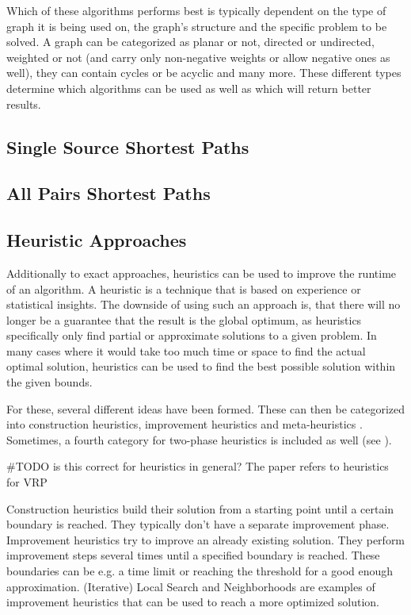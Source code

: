 Which of these algorithms performs best is typically dependent on the type of graph it is being used on, the graph's structure and the specific problem to be solved. 
A graph can be categorized as planar or not, directed or undirected, weighted or not (and carry only non-negative weights or allow negative ones as well), they can contain cycles or be acyclic and many more. 
These different types determine which algorithms can be used as well as which will return better results.

\subsection{Single Source Shortest Paths}


\subsection{All Pairs Shortest Paths}


\subsection{Heuristic Approaches}

Additionally to exact approaches, heuristics can be used to improve the runtime of an algorithm.
A heuristic is a technique that is based on experience or statistical insights.
The downside of using such an approach is, that there will no longer be a guarantee that the result is the global optimum, as heuristics specifically only find partial or approximate solutions to a given problem. 
In many cases where it would take too much time or space to find the actual optimal solution, heuristics can be used to find the best possible solution within the given bounds.

For these, several different ideas have been formed. 
These can then be categorized into construction heuristics, improvement heuristics and meta-heuristics \cite{ropke_heuristic_2005}.
Sometimes, a fourth category for two-phase heuristics is included as well (see \cite{laporteClassicalHeuristicsCapacitated2002a}).

\#TODO is this correct for heuristics in general? The paper refers to heuristics for VRP

Construction heuristics build their solution from a starting point until a certain boundary is reached. 
They typically don't have a separate improvement phase.
Improvement heuristics try to improve an already existing solution.
They perform improvement steps several times until a specified boundary is reached.
These boundaries can be e.g. a time limit or reaching the threshold for a good enough approximation.
(Iterative) Local Search and Neighborhoods are examples of improvement heuristics that can be used to reach a more optimized solution. \cite{laporteClassicalHeuristicsCapacitated2002a, ropke_heuristic_2005}



